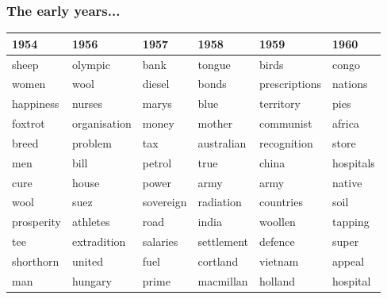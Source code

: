 \documentclass{beamer}       %
\begin{document}
\begin{frame}
\frametitle{The early years...}
\begin{table}[h!]
\tiny
\begin{tabular}{llllll}

\toprule
\textbf{1954}        & \textbf{1956}         & \textbf{1957}         & \textbf{1958}       & \textbf{1959}          & \textbf{1960}          \\ \midrule
\cellcolor{red!25}sheep       & olympic      & \cellcolor{orange!25}bank         & tongue     & \cellcolor{red!25}birds         & \cellcolor{blue!25}congo         \\
women       & \cellcolor{red!25}wool         & diesel       & \cellcolor{orange!25}bonds      & \cellcolor{yellow!25}prescriptions & nations       \\
happiness   & \cellcolor{yellow!25}nurses       & marys        & blue       & territory     & pies          \\
foxtrot     & organisation & \cellcolor{orange!25}money        & mother     & \cellcolor{blue!25}communist     & \cellcolor{blue!25}africa        \\
breed       & problem      & \cellcolor{orange!25}tax          & australian & recognition   & store         \\
men         & \cellcolor{gray!25}bill         & \cellcolor{red!25}petrol       & true       & \cellcolor{blue!25}china         & \cellcolor{yellow!25}hospitals     \\
\cellcolor{yellow!25}cure        & \cellcolor{gray!25}house        & power        & \cellcolor{green!25}army       & \cellcolor{green!25}army          & native        \\
\cellcolor{red!25}wool        & \cellcolor{blue!25}suez         & sovereign    & \cellcolor{yellow!25}radiation  & countries     & \cellcolor{red!25}soil          \\
prosperity  & athletes     & \cellcolor{red!25}road         & \cellcolor{blue!25}india      & \cellcolor{red!25}woollen       & tapping       \\
tee         & extradition  & \cellcolor{red!25}salaries     & settlement & \cellcolor{green!25}defence       & super         \\
shorthorn   & united       & \cellcolor{red!25}fuel         & cortland   & \cellcolor{blue!25}vietnam       & appeal        \\
man         & \cellcolor{blue!25}hungary      & \cellcolor{gray!25}prime        & macmillan  & \cellcolor{blue!25}holland       & \cellcolor{yellow!25}hospital      \\

\end{tabular}
\end{table}
\end{frame}
\end{document}
